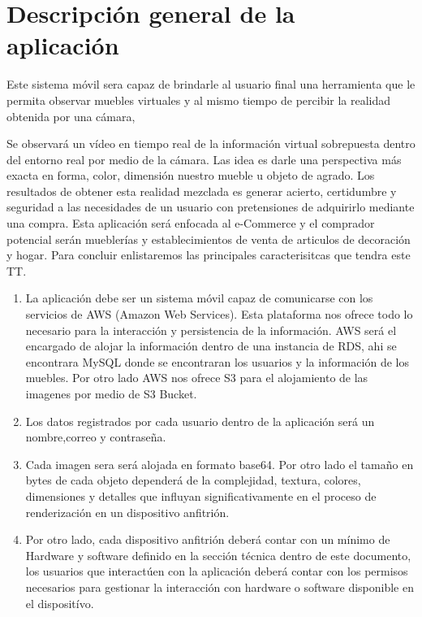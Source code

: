 \section{Descripción general de la aplicación}
Este sistema móvil sera capaz de  brindarle al usuario final una herramienta que le permita observar muebles virtuales y al mismo tiempo de percibir la realidad obtenida por una cámara,\par
\vspace{5mm}
Se observará un vídeo en tiempo real de la información virtual sobrepuesta dentro del entorno real por medio de la cámara. Las idea es darle una perspectiva más exacta en forma, color, dimensión nuestro mueble u objeto de agrado. Los resultados de obtener esta realidad mezclada es generar acierto, certidumbre y seguridad a las necesidades de un usuario con pretensiones de adquirirlo mediante una compra. Esta aplicación será enfocada al e-Commerce y el comprador potencial serán mueblerías y establecimientos de venta de articulos de decoración y hogar. Para concluir enlistaremos las principales caracterisitcas que tendra este TT.\par
\vspace{5mm}
\begin{enumerate}[1.]
	\item La aplicación debe ser un sistema móvil capaz de comunicarse con los servicios de AWS (Amazon Web Services). Esta plataforma nos ofrece todo lo necesario para la interacción y persistencia de la información. AWS será el encargado de alojar la información dentro de una instancia de RDS, ahi se encontrara MySQL donde se encontraran los usuarios y la información de los muebles. Por otro lado AWS nos ofrece S3 para el alojamiento de las imagenes por medio de S3 Bucket. 
	\item Los datos registrados por cada usuario dentro de la aplicación será un nombre,correo y contraseña.\par
	\item Cada imagen sera será alojada en formato base64. Por otro lado el tamaño en bytes de cada objeto dependerá de la complejidad, textura, colores, dimensiones y detalles que influyan significativamente en el proceso de renderización en un dispositivo anfitrión.\par
	\item Por otro lado, cada dispositivo anfitrión deberá contar con un mínimo de Hardware y software definido en la sección técnica dentro de este documento, los usuarios que interactúen con la aplicación deberá contar con los permisos necesarios para gestionar  la interacción con hardware o software disponible en el dispositívo.\par	
\end{enumerate}

